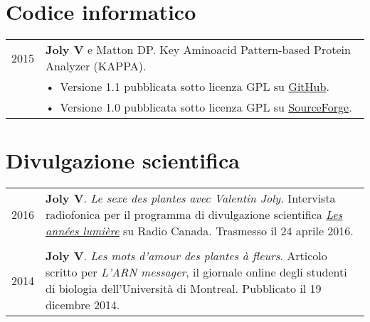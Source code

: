 \documentclass[letterpaper,12pt]{article}
\begin{document}
\vspace{6mm}

\section[Codice informatico]{Codice informatico}

\begin{tabularx}{\textwidth}{@{}r|X@{}}

2015
& \textbf{Joly V} e Matton DP. Key Aminoacid Pattern-based Protein Analyzer
  (KAPPA). \\
& \small \hspace{1.5mm} •~Versione 1.1 pubblicata sotto licenza GPL su
  \href{https://github.com/valentinjoly/kappa-1.1}{GitHub}. \\
& \small \hspace{1.5mm} •~Versione 1.0 pubblicata sotto licenza GPL su
  \href{https://sourceforge.net/projects/kappa-sequence-search/}{SourceForge}.
  \\

\end{tabularx}

\vspace{6mm}

\section[Divulgazione scientifica]{Divulgazione scientifica}

\begin{tabularx}{\textwidth}{@{}r|X@{}}

2016
& \textbf{Joly V}. {\em Le sexe des plantes avec Valentin Joly.} Intervista
  radiofonica per il programma di divulgazione scientifica
  \href{http://ici.radio-canada.ca/emissions/les_annees_lumiere/2009-2010/chronique.asp?idChronique=404672}{\emph{Les années lumière}}
  su Radio Canada. Trasmesso il 24 aprile 2016. \\

\multicolumn{2}{c}{} \\

2014
& \textbf{Joly V}. {\em Les mots d’amour des plantes à fleurs}. Articolo scritto
  per \emph{L'ARN messager}, il giornale online degli studenti di biologia
  dell’Università di Montreal. Pubblicato il 19 dicembre 2014.
  \\

\end{tabularx}

\newpage
\end{document}
